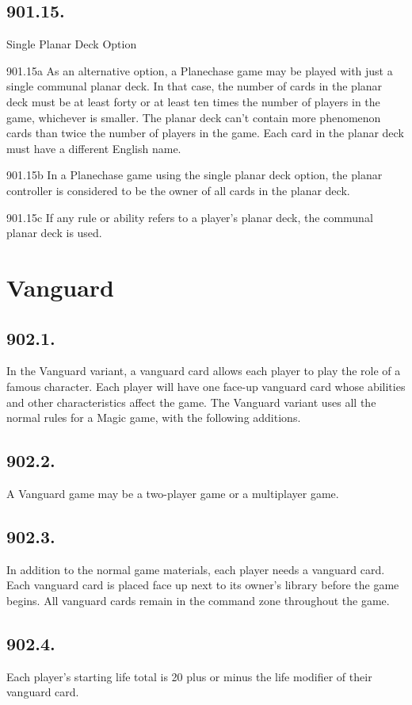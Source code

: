 \subsection*{901.15.}
Single Planar Deck Option

901.15a As an alternative option, a Planechase game may be played with just a single communal planar deck. In that case, the number of cards in the planar deck must be at least forty or at least ten times the number of players in the game, whichever is smaller. The planar deck can’t contain more phenomenon cards than twice the number of players in the game. Each card in the planar deck must have a different English name.

901.15b In a Planechase game using the single planar deck option, the planar controller is considered to be the owner of all cards in the planar deck.

901.15c If any rule or ability refers to a player’s planar deck, the communal planar deck is used.

\section{Vanguard}
\subsection*{902.1.}
In the Vanguard variant, a vanguard card allows each player to play the role of a famous character. Each player will have one face-up vanguard card whose abilities and other characteristics affect the game. The Vanguard variant uses all the normal rules for a Magic game, with the following additions.

\subsection*{902.2.}
A Vanguard game may be a two-player game or a multiplayer game.

\subsection*{902.3.}
In addition to the normal game materials, each player needs a vanguard card. Each vanguard card is placed face up next to its owner’s library before the game begins. All vanguard cards remain in the command zone throughout the game.

\subsection*{902.4.}
Each player’s starting life total is 20 plus or minus the life modifier of their vanguard card.

